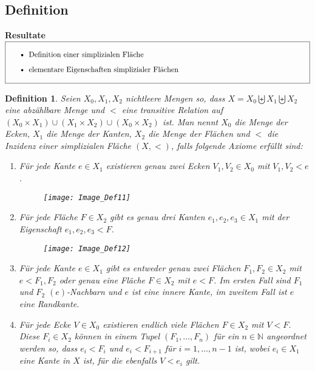 \documentclass[12pt,titlepage,twoside,cleardoublepage]{article}
\theoremstyle{nummermitklammern}
\newtheorem{definition}[temp]{Definition}
\newtheorem{definition}[zahl]{Definition}
\numberwithin{equation}{section}
\begin{document}
\subsection{Definition}
\textbf{Resultate} \\
$\fbox{
\parbox{14cm}{\begin{itemize}
\item Definition einer simplizialen Fl\"ache 
\item elementare Eigenschaften simplizialer Fl\"achen
\end{itemize}
}}$\\
\begin{definition}  \label{def1} 
Seien $X_0,X_1,X_2$ nichtleere Mengen so, dass $X=X_{0} \biguplus X_{1} \biguplus X_{2}$ eine abzählbare Menge und $<$ eine transitive Relation auf  $(X_{0}\times X_{1}) \cup (X_{1}\times X_{2})\cup (X_{0}\times X_{2})$ ist.
 Man nennt $X_{0}$ \emph{die Menge der Ecken}, $X_{1}$ \emph{die Menge der Kanten}, $X_{2}$ \emph{die Menge der Flächen} und $<$ die \emph{Inzidenz} einer \emph{simplizialen Fläche} $(X,<)$, falls folgende Axiome erfüllt sind:
 \begin{enumerate}
\item Für jede Kante $e \in X_{1}$ existieren genau zwei Ecken $V_1,V_2 \in X_{0}$ mit $V_1,V_2 < e$. 
\begin{figure}[H]
\begin{center}
\texttt{[image: Image\_Def11]}
\end{center}
\end{figure}
\item Für jede Fläche $F\in X_2$ gibt es genau drei Kanten $e_1,e_2,e_3 \in X_{1}$ mit der Eigenschaft $e_1,e_2,e_3 < F$.
\begin{figure}[H]
\begin{center}
\texttt{[image: Image\_Def12]}
\end{center}
\end{figure} 
\item Für jede Kante $e \in X_{1}$ gibt es entweder genau zwei Flächen $F_{1},F_{2} \in X_{2}$ mit $e <F_{1},F_2$ oder
genau eine Fläche $F \in X_{2}$ mit $e < F$. Im ersten Fall sind $F_{1}$ und $F_{2}$ \emph{$(e)$-Nachbarn} und $e$ ist eine \emph{innere Kante}, im zweitem Fall ist $e$ eine \emph{Randkante}. 
 \item Für jede Ecke $V \in X_{0}$ existieren endlich viele Flächen $F\in X_{2}$ mit $V < F$.
  Diese $F_{i}\in X_2$ können in einem Tupel $(F_{1},\ldots,F_{n})$ für ein $n \in \mathbb{N}$ angeordnet werden so, dass $e_i<F_{i}$ und $e_i<F_{i+1}$ für $i=1,\ldots,n-1$ ist, wobei $e_i\in X_1$ eine Kante  in $X$ ist, für die ebenfalls $V<e_i$ gilt. 

\end{enumerate}
\end{definition}
\end{document}
